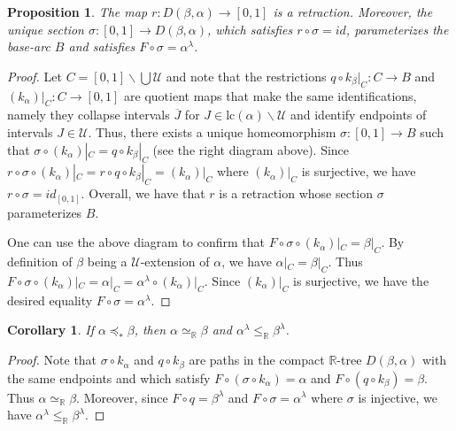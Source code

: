 \documentclass[12pt, leqno]{amsart}
\newcommand{\light}{\lambda}
\newcommand{\ord}{\preceq_{\ast}}
\newcommand{\ui}{[0,1]}
\newcommand{\den}{\simeq_{\bbr}}
\newcommand{\scru}{\mathscr{U}}
\newcommand{\bbr}{\mathbb{R}}
\newcommand{\ov}{\overline}
\newcommand{\lc}{\text{lc}}
\newtheorem{proposition}[theorem]{Proposition}
\newtheorem{corollary}[theorem]{Corollary}
\theoremstyle{definition}\newtheorem{definition}[theorem]{Definition}
\begin{document}
\begin{proposition}\label{retractionprop}
The map $r:D(\beta,\alpha)\to \ui$ is a retraction. Moreover, the unique section $\sigma:\ui\to D(\beta,\alpha)$, which satisfies $r\circ\sigma=id$, parameterizes the base-arc $B$ and satisfies $F\circ \sigma=\alpha^{\light}$.
\end{proposition}

\begin{proof}
Let $C=\ui\backslash \bigcup\scru$ and note that the restrictions $q\circ k_{\beta}|_{C}:C\to B$ and $(k_{\alpha})|_{C}:C\to \ui$ are quotient maps that make the same identifications, namely they collapse intervals $\ov{J}$ for $J\in\lc(\alpha)\backslash \scru$ and identify endpoints of intervals $J\in\scru$. Thus, there exists a  unique homeomorphism $\sigma:\ui\to B$ such that $\sigma\circ (k_{\alpha})|_{C}=q\circ k_{\beta}|_{C}$ (see the right diagram above). Since $r\circ \sigma\circ (k_{\alpha})|_{C}=r\circ q\circ k_{\beta}|_{C}=(k_{\alpha})|_{C}$ where $(k_{\alpha})|_{C}$ is surjective, we have $r\circ \sigma=id_{\ui}$. Overall, we have that $r$ is a retraction whose section $\sigma$ parameterizes $B$.

One can use the above diagram to confirm that $F\circ \sigma\circ (k_{\alpha})|_{C}=\beta|_{C}$. By definition of $\beta$ being a $\scru$-extension of $\alpha$, we have $\alpha|_{C}=\beta|_{C}$. Thus $F\circ \sigma\circ (k_{\alpha})|_{C}=\alpha|_{C}=\alpha^{\light}\circ (k_{\alpha})|_{C}$. Since $(k_{\alpha})|_{C}$ is surjective, we have the desired equality $F\circ \sigma=\alpha^{\light}$.
\end{proof}





\begin{corollary}
If $\alpha\ord\beta$, then $\alpha\simeq_{\bbr}\beta$ and $\alpha^{\lambda}\leq_{\bbr}\beta^{\lambda}$.
\end{corollary}

\begin{proof}
Note that $\sigma\circ k_{\alpha}$ and $q\circ k_{\beta}$ are paths in the compact $\bbr$-tree $D(\beta,\alpha)$ with the same endpoints and which satisfy $F\circ (\sigma\circ k_{\alpha})=\alpha$ and $F\circ (q\circ k_{\beta})=\beta$. Thus $\alpha\den\beta$. Moreover, since $F\circ q=\beta^{\lambda}$ and $F\circ \sigma=\alpha^{\lambda}$ where $\sigma$ is injective, we have $\alpha^{\lambda}\leq_{\bbr}\beta^{\lambda}$.
\end{proof}
\end{document}
